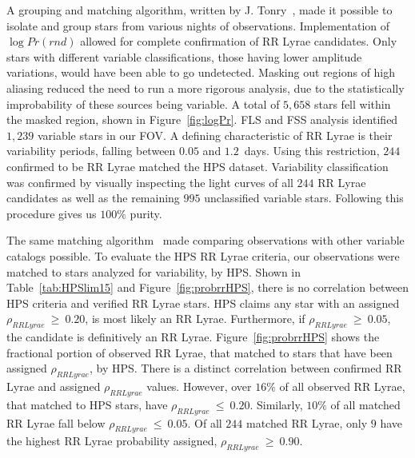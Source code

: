 \documentclass[aps,prb,twocolumn,superscriptaddress]{revtex4-1}
\begin{document}
A grouping and matching algorithm, written by J. Tonry~\cite{gri}, made it possible to isolate and group 
stars from various nights of observations.  
Implementation of $\log{Pr(rnd)}$ allowed for complete confirmation of RR Lyrae candidates.  Only stars with different 
variable classifications, those having lower amplitude variations, would have been able to go
undetected.  Masking out regions of high aliasing reduced the need to run a more rigorous analysis, %
due to the statistically improbability of these sources being variable.  A total of $5,658$ stars fell within 
the masked region, shown in Figure~\ref{fig:logPr}.  FLS and FSS analysis identified $1,239$ variable stars in our FOV.  
A defining characteristic of RR Lyrae is their variability periods, falling between $0.05$ and $1.2$~days.  Using this 
restriction, $244$ confirmed to be RR Lyrae matched the HPS dataset.  Variability classification was confirmed by visually inspecting 
the light curves of all $244$ RR Lyrae candidates as well as the remaining $995$ unclassified variable stars.  Following this procedure gives us $100\%$ purity.


The same matching algorithm~\cite{gri} made comparing observations with other variable catalogs possible.  
To evaluate the HPS RR Lyrae criteria, our observations were matched to stars analyzed for variability, by HPS.  
Shown in Table~\ref{tab:HPSlim15} and Figure~\ref{fig:probrrHPS}, there is no correlation between HPS criteria and 
verified RR Lyrae stars.  HPS claims any star with an assigned $\rho_{RRLyrae}~\geq~0.20$, is most likely an RR Lyrae.  Furthermore, 
if $\rho_{RRLyrae}~\geq~0.05$, the candidate is definitively an RR Lyrae.  Figure~\ref{fig:probrrHPS} shows the fractional 
portion of observed RR Lyrae, that matched to stars that have been assigned $\rho_{RRLyrae}$, by HPS.
There is a distinct correlation between confirmed RR Lyrae and assigned $\rho_{RRLyrae}$ values.  However, over $16\%$ of 
all observed RR Lyrae, that matched to HPS stars, have $\rho_{RRLyrae}~\leq~0.20$.  Similarly, $10\%$ of all matched RR Lyrae 
fall below $\rho_{RRLyrae}~\leq~0.05$.  Of all $244$ matched RR Lyrae, only $9$ have the highest RR Lyrae 
probability assigned, $\rho_{RRLyrae}~\geq~0.90$.
\end{document}
